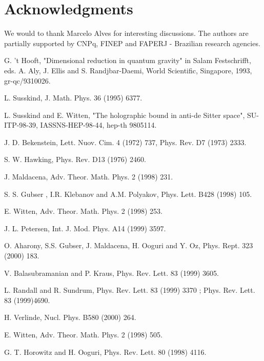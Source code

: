 \documentclass[a4paper,12pt]{article}
\begin{document}
{{ 
\section*{Acknowledgments} 
We would to thank Marcelo Alves for interesting discussions. 
The authors are partially supported by CNPq, FINEP and FAPERJ 
- Brazilian research agencies. 

  


\begin{thebibliography}{30}

 G. 't Hooft, "Dimensional reduction in quantum gravity"
in Salam Festschrifft, eds. A. Aly, J. Ellis and S. Randjbar-Daemi,
 World Scientific, Singapore, 1993, gr-qc/9310026.

 L. Susskind, J. Math. Phys. 36 (1995) 6377.

 L. Susskind and E. Witten, "The holographic bound in anti-de 
Sitter space", SU-ITP-98-39, IASSNS-HEP-98-44, hep-th 9805114.

 J. D. Bekenstein, Lett. Nuov. Cim. 4 (1972) 737, 
Phys. Rev. D7 (1973) 2333.

 S. W. Hawking, Phys. Rev. D13 (1976) 2460.

 J. Maldacena, Adv. Theor. Math. Phys. 2 (1998) 231.

 S. S. Gubser , I.R. Klebanov and A.M. Polyakov, 
Phys. Lett. B428 (1998) 105.

 E. Witten, Adv. Theor. Math. Phys. 2 (1998) 253.

 J. L. Petersen, Int. J. Mod. Phys. A14 (1999) 3597.

 O. Aharony, S.S. Gubser, J. Maldacena, 
H. Ooguri and Y. Oz, Phys. Rept. 323 (2000) 183.
  
 V. Balasubramanian and P. Kraus, Phys. Rev. Lett. 83 (1999) 3605.

 L. Randall and R. Sundrum, Phys. Rev. Lett. 83 (1999) 
3370 ; Phys. Rev. Lett. 83 (1999)4690.

 H. Verlinde, Nucl. Phys. B580 (2000) 264.

 E. Witten, Adv. Theor. Math. Phys. 2 (1998) 505.

 G. T. Horowitz and H. Ooguri, Phys. Rev. Lett. 80 (1998) 4116.


\end{thebibliography}}}
\end{document}
